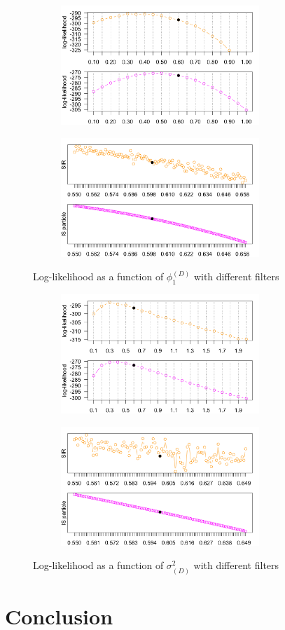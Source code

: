 \documentclass[11pt, oneside]{scrreprt}   	%
\begin{document}
\begin{figure}[h!]
\centering
\begin{subfigure}{.5\textwidth}
  \centering
  \includegraphics[width=75mm]{../../images/hdpm-loglik-Dphi1.png}
\end{subfigure}%
\begin{subfigure}{.5\textwidth}
  \centering
  \includegraphics[width=75mm]{../../images/hdpm-loglik-Dphi1-zoom.png}
\end{subfigure}
\caption{Log-likelihood as a function of $\phi_1^{(D)}$ with different filters}
\label{fig:hdpm_loglik_Dphi1}
\end{figure}

\begin{figure}[h!]
\centering
\begin{subfigure}{.5\textwidth}
  \centering
  \includegraphics[width=75mm]{../../images/hdpm-loglik-Dvar.png}
\end{subfigure}%
\begin{subfigure}{.5\textwidth}
  \centering
  \includegraphics[width=75mm]{../../images/hdpm-loglik-Dvar-zoom.png}
\end{subfigure}
\caption{Log-likelihood as a function of $\sigma_{(D)}^2$ with different filters}
\label{fig:hdpm_loglik_Dvar}
\end{figure}


\chapter{Conclusion}
\label{chp:conclusion}


\nocite{*}


\end{document}
